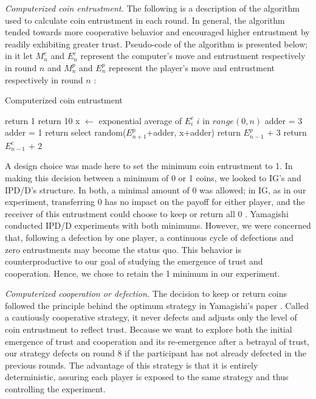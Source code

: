 \documentclass{sig-alternate}
\begin{document}
\textit{Computerized coin entrustment. } The following is a description of the algorithm used to calculate coin entrustment in each round. In general, the algorithm tended towards more cooperative behavior and encouraged higher entrustment by readily exhibiting greater trust. Pseudo-code of the algorithm is presented below; in it let $M_{n}^c$ and $E_{n}^c$ represent the computer's move and entrustment respectively in round $n$ and $M_{n}^p$ and $E_{n}^p$ represent the player's move and entrustment respectively in round $n$ : 

\begin{algorithm}
\caption{Computerized coin entrustment}
\begin{algorithmic}
\STATE return 1
\STATE return 10 
\ELSE
\STATE x $\leftarrow$ exponential average of $E_{i}^c$  $i$ in $range(0,n)$
\STATE adder = 3
\ELSE
\STATE adder = 1
\ENDIF
\STATE return select random($E_{n+1}^p$+adder, x+adder)
\STATE return $E_{n-1}^p$ + 3
\STATE return $E_{n-1}^c$ + 2
\ENDIF
\ENDIF
\end{algorithmic}
\end{algorithm}

A design choice was made here to set the minimum coin entrustment to 1. In making this decision between a minimum of 0 or 1 coins, we looked to IG's and IPD/D's structure. In both, a minimal amount of 0 was allowed; in IG, as in our experiment, transferring 0 has no impact on the payoff for either player, and the receiver of this entrustment could choose to keep or return all 0 \cite{berg1995trust}. Yamagishi conducted IPD/D experiments with both minimums. However, we were concerned that, following a defection by one player, a continuous cycle of defections and zero entrustments may become the status quo. This behavior is counterproductive to our goal of studying the emergence of trust and cooperation. Hence, we chose to retain the 1 minimum in our experiment.

\textit{Computerized cooperation or defection. } The decision to keep or return coins followed the principle behind the optimum strategy in Yamagishi's paper \cite{yamagishi2005separating}. Called a cautiously cooperative strategy, it never defects and adjusts only the level of coin entrustment to reflect trust. Because we want to explore both the initial emergence of trust and cooperation and its re-emergence after a betrayal of trust, our strategy defects on round 8 if the participant has not already defected in the previous rounds. The advantage of this strategy is that it is entirely deterministic, assuring each player is exposed to the same strategy and thus controlling the experiment.
\end{document}
